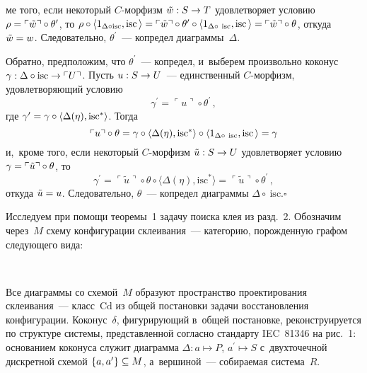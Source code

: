 \begin{multicols}{2}
\pagebreak

\noindent
ме того, 
если некоторый 
$C$-мор\-физм $\tilde{w} : S \hm\to T$ удовле\-тво\-ря\-ет условию $\rho\hm = 
\ulcorner \tilde{w}\urcorner \circ \theta^{\prime}$, то
 $\rho\circ \langle 1_{\Delta\circ 
\mathrm{isc}}, \mathrm{isc}\,\rangle\hm = \ulcorner\tilde{w}\urcorner 
\circ \theta^\prime\circ\langle 
1_{\Delta\circ~\mathrm{isc}}, \mathrm{isc}\,\rangle\hm = 
\ulcorner \tilde{w}\urcorner \circ \theta$, 
откуда 
$\tilde{w}\hm=w$. Следовательно, $\theta^\prime$~--- копредел 
диаграммы~$\Delta$.
   
   Обратно, предположим, что $\theta^\prime$~--- копредел, и~выберем 
произвольно коконус $\gamma : \Delta \circ \mathrm{isc} \hm\to \ulcorner U\urcorner$. 
Пусть $u : S \hm\to U$~--- единственный $C$-мор\-физм, удовлетворяющий 
условию 
$$
\gamma^\prime = \ulcorner u\urcorner \circ \theta^\prime\,,
$$
 где 
$\gamma^\prime\hm = \gamma \circ \langle \Delta (\eta), \mathrm{isc}^*\rangle$. Тогда 
$$
\ulcorner u\urcorner \circ \theta = \gamma\circ \langle \Delta (\eta), 
\mathrm{isc}^*\rangle 
\circ \langle 1_{\Delta\circ~\mathrm{isc}}, 
\mathrm{isc}\,\rangle\hm = \gamma$$
 и,~кроме того, если 
некоторый $C$-мор\-физм $\tilde{u} : S \hm\to U$ удовлетворяет условию 
$\gamma\hm = \ulcorner \tilde{u}\urcorner \circ\theta$, то 
$$
\gamma^\prime = \ulcorner 
\tilde{u}\urcorner \circ \theta \circ \langle\Delta (\eta), 
\mathrm{isc}^*\rangle = \ulcorner 
\tilde{u}\urcorner\circ\theta^\prime\,,
$$
 откуда $\tilde{u}\hm= u$. Следовательно, 
$\theta$~--- копредел диаграммы $\Delta \circ~\mathrm{isc}$.\hfill$\square$
   
   \smallskip
   
   Исследуем при помощи теоремы~1 задачу поиска клея из разд.~2. 
Обозначим через~$M$ схему конфигурации склеивания~--- категорию, 
порожденную графом следующего вида:
   \begin{center} %
   \vspace*{1pt}
 \mbox{%
 \epsfxsize=37.099mm 
 }
   \end{center}


   Все диаграммы со схемой~$M$ образуют пространство проектирования 
склеивания~--- класс~$\mathrm{Cd}$ из общей постановки задачи восстановления 
конфигурации. Коконус~$\delta$, фигурирующий в~общей постановке, 
реконструируется по структуре сис\-те\-мы, представленной согласно стандарту 
IEC~81346 на рис.~1: основанием коконуса служит диаграмма $\Delta : a 
\mapsto P$, $a^\prime\mapsto S$ с~двухточечной дискретной схемой $\{a, 
a^\prime\} \hm\subseteq M$, а~вершиной~--- собираемая сис\-те\-ма~$R$.
   

\end{multicols}
